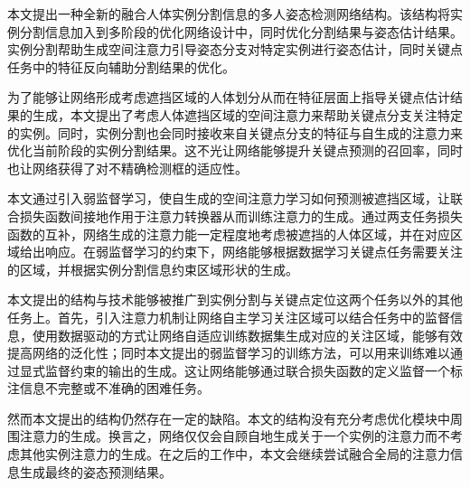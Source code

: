 \begin{conclusion}
	
本文提出一种全新的融合人体实例分割信息的多人姿态检测网络结构。该结构将实例分割信息加入到多阶段的优化网络设计中，同时优化分割结果与姿态估计结果。实例分割帮助生成空间注意力引导姿态分支对特定实例进行姿态估计，同时关键点任务中的特征反向辅助分割结果的优化。

为了能够让网络形成考虑遮挡区域的人体划分从而在特征层面上指导关键点估计结果的生成，本文提出了考虑人体遮挡区域的空间注意力来帮助关键点分支关注特定的实例。同时，实例分割也会同时接收来自关键点分支的特征与自生成的注意力来优化当前阶段的实例分割结果。这不光让网络能够提升关键点预测的召回率，同时也让网络获得了对不精确检测框的适应性。

本文通过引入弱监督学习，使自生成的空间注意力学习如何预测被遮挡区域，让联合损失函数间接地作用于注意力转换器从而训练注意力的生成。通过两支任务损失函数的互补，网络生成的注意力能一定程度地考虑被遮挡的人体区域，并在对应区域给出响应。在弱监督学习的约束下，网络能够根据数据学习关键点任务需要关注的区域，并根据实例分割信息约束区域形状的生成。

本文提出的结构与技术能够被推广到实例分割与关键点定位这两个任务以外的其他任务上。首先，引入注意力机制让网络自主学习关注区域可以结合任务中的监督信息，使用数据驱动的方式让网络自适应训练数据集生成对应的关注区域，能够有效提高网络的泛化性；同时本文提出的弱监督学习的训练方法，可以用来训练难以通过显式监督约束的输出的生成。这让网络能够通过联合损失函数的定义监督一个标注信息不完整或不准确的困难任务。

然而本文提出的结构仍然存在一定的缺陷。本文的结构没有充分考虑优化模块中周围注意力的生成。换言之，网络仅仅会自顾自地生成关于一个实例的注意力而不考虑其他实例注意力的生成。在之后的工作中，本文会继续尝试融合全局的注意力信息生成最终的姿态预测结果。

\end{conclusion}